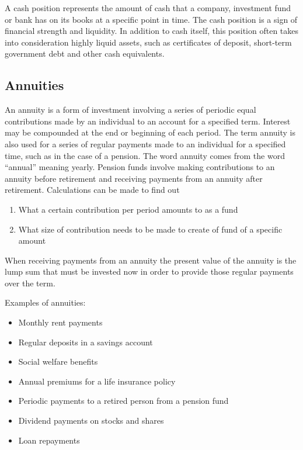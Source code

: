 \documentclass[]{book}
\providecommand{\tightlist}{%
  \setlength{\itemsep}{0pt}\setlength{\parskip}{0pt}}
\theoremstyle{definition}
\theoremstyle{definition}
\theoremstyle{definition}
\theoremstyle{remark}
\begin{document}
A cash position represents the amount of cash that a company, investment
fund or bank has on its books at a specific point in time. The cash
position is a sign of financial strength and liquidity. In addition to
cash itself, this position often takes into consideration highly liquid
assets, such as certificates of deposit, short-term government debt and
other cash equivalents.

\subsection{Annuities}\label{annuities}

An annuity is a form of investment involving a series of periodic equal
contributions made by an individual to an account for a specified term.
Interest may be compounded at the end or beginning of each period. The
term annuity is also used for a series of regular payments made to an
individual for a specified time, such as in the case of a pension. The
word annuity comes from the word ``annual'' meaning yearly. Pension
funds involve making contributions to an annuity before retirement and
receiving payments from an annuity after retirement. Calculations can be
made to find out

\begin{enumerate}
\def\labelenumi{(\roman{enumi})}
\tightlist
\item
  What a certain contribution per period amounts to as a fund
\item
  What size of contribution needs to be made to create of fund of a
  specific amount
\end{enumerate}

When receiving payments from an annuity the present value of the annuity
is the lump sum that must be invested now in order to provide those
regular payments over the term.

Examples of annuities:

\begin{itemize}
\tightlist
\item
  Monthly rent payments
\item
  Regular deposits in a savings account
\item
  Social welfare benefits
\item
  Annual premiums for a life insurance policy
\item
  Periodic payments to a retired person from a pension fund
\item
  Dividend payments on stocks and shares
\item
  Loan repayments
\end{itemize}
\end{document}
